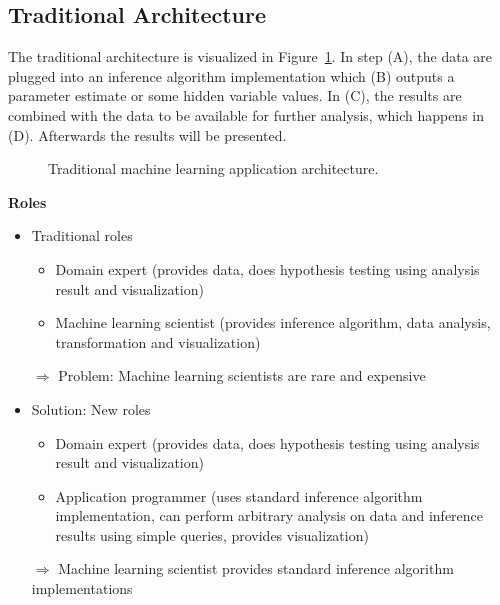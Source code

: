 \subsection{Traditional Architecture}

The traditional architecture is visualized in Figure~\ref{fig:ml-application-architecture}. In step (A), the data are plugged into an inference algorithm implementation which (B) outputs a parameter estimate or some hidden variable values. In (C), the results are combined with the data to be available for further analysis, which happens in (D). Afterwards the results will be presented.



\begin{figure}[t]
\centering
\scalebox{\tikzScale}{\adjustTikzSize }
\caption{Traditional machine learning application architecture.}\label{fig:ml-application-architecture}
\end{figure}

\textbf{Roles}
\begin{itemize}
\item Traditional roles
	\begin{itemize}
	\item Domain expert (provides data, does hypothesis testing using analysis result and visualization)
	\item Machine learning scientist (provides inference algorithm, data analysis, transformation and visualization)
	\end{itemize}
	$\Rightarrow$ Problem: Machine learning scientists are rare and expensive
\item Solution: New roles
	\begin{itemize}
	\item Domain expert (provides data, does hypothesis testing using analysis result and visualization)
	\item Application programmer (uses standard inference algorithm implementation, can perform arbitrary analysis on data and inference results using simple queries, provides visualization)
	\end{itemize}
	$\Rightarrow$ Machine learning scientist provides standard inference algorithm implementations
\end{itemize}

